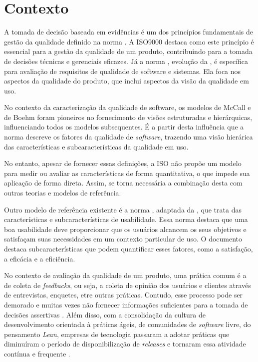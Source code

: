 \section{Contexto}\label{contextualizacao}



A tomada de decisão baseada em evidências é um dos princípios fundamentais de gestão da qualidade definido na norma . A ISO9000 destaca como este princípio é essencial para a gestão da qualidade de um produto, contribuindo para a tomada de decisões técnicas e gerenciais eficazes. Já a norma , evolução da , é específica para avaliação de requisitos de qualidade de software e sistemas. Ela foca nos aspectos da qualidade do produto, que inclui aspectos da visão da qualidade em uso. 

No contexto da caracterização da qualidade de software, os modelos de McCall \cite{mccall1977factors} e de Boehm \cite{boehm1978characteristics} foram pioneiros no fornecimento de visões estruturadas e hierárquicas, influenciando todos os modelos subsequentes. É a partir desta influência que a norma  descreve os fatores da qualidade de \textit{software}, trazendo uma visão hierárica das características e subcaracterísticas da qualidade em uso.

No entanto, apesar de fornecer essas definições, a ISO não propõe um modelo para medir ou avaliar as características de forma quantitativa, o que impede sua aplicação de forma direta. Assim, se torna necessária a combinação desta com outras teorias e modelos de referência.

Outro modelo de referência existente é a norma , adaptada da , que trata das características e subcaracterísticas de usabilidade. Essa norma destaca que uma boa usabilidade deve proporcionar que os usuários alcancem os seus objetivos e satisfaçam suas necessidades em um contexto particular de uso. O documento destaca subcaracterísticas que podem quantificar esses fatores, como a satisfação, a eficácia e a eficiência.

No contexto de avaliação da qualidade de um produto, uma prática comum é a de coleta de \textit{feedbacks}, ou seja, a coleta de opinião dos usuários e clientes através de entrevistas, enquetes, etre outras práticas. Contudo, esse processo pode ser demorado e muitas vezes não fornecer informações suficientes para a tomada de decisões assertivas \cite{olsson_opinions_2014}. Além disso, com a consolidação da cultura de desenvolvimento orientada à práticas ágeis, de comunidades de \textit{software} livre, do pensamento \textit{Lean}, empresas de tecnologia passaram a adotar práticas que diminuíram o período de disponibilização de \textit{releases} e tornaram essa atividade contínua e frequente \cite{kevic_characterizing_2017}.

